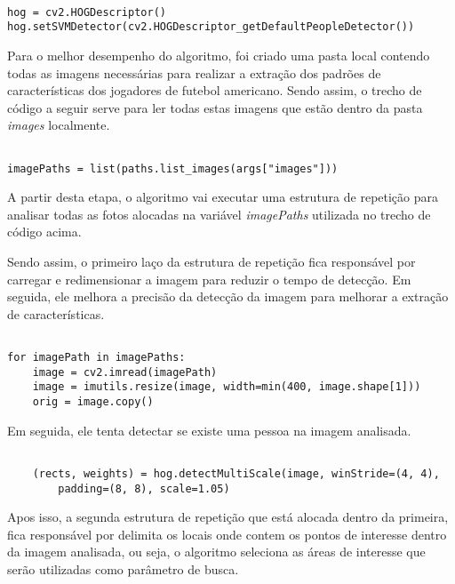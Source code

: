 \begin{verbatim}

hog = cv2.HOGDescriptor()
hog.setSVMDetector(cv2.HOGDescriptor_getDefaultPeopleDetector())

\end{verbatim}

Para o melhor desempenho do algoritmo, foi criado uma pasta local contendo todas as imagens necessárias para realizar a extração dos padrões de características dos jogadores de futebol americano. Sendo assim, o trecho de código a seguir serve para ler todas estas imagens que estão dentro da pasta \textit{images} localmente.

\begin{verbatim}

imagePaths = list(paths.list_images(args["images"]))

\end{verbatim}

A partir desta etapa, o algoritmo vai executar uma estrutura de repetição para analisar todas as fotos alocadas na variável \textit{imagePaths} utilizada no trecho de código acima.

Sendo assim, o primeiro laço da estrutura de repetição fica responsável por carregar e redimensionar a imagem para reduzir o tempo de detecção. Em seguida, ele melhora a precisão da detecção da imagem para melhorar a extração de características.

\begin{verbatim}

for imagePath in imagePaths:
	image = cv2.imread(imagePath)
	image = imutils.resize(image, width=min(400, image.shape[1]))
	orig = image.copy()

\end{verbatim}

Em seguida, ele tenta detectar se existe uma pessoa na imagem analisada.

\begin{verbatim}

    (rects, weights) = hog.detectMultiScale(image, winStride=(4, 4),
        padding=(8, 8), scale=1.05)

\end{verbatim}

Apos isso, a segunda estrutura de repetição que está alocada dentro da primeira, fica responsável por delimita os locais onde contem os pontos de interesse dentro da imagem analisada, ou seja, o algoritmo seleciona as áreas de interesse que serão utilizadas como parâmetro de busca.

